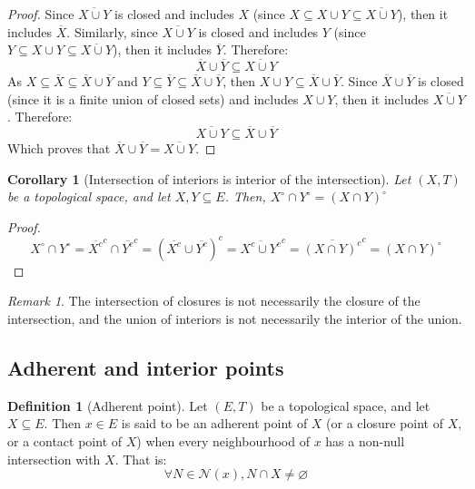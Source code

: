 \documentclass{article}
\newtheorem{corollary}[theorem]{Corollary}
\theoremstyle{definition}
\newtheorem{definition}{Definition}[section]
\theoremstyle{remark}
\newtheorem*{remark}{Remark}
\theoremstyle{example}
\theoremstyle{notation}
\newcommand{\inter}[1]{{{#1}^\circ}}
\begin{document}
\begin{proof}
		Since $\overline{X \cup Y}$ is closed and includes $X$ (since $X \subseteq X \cup Y \subseteq \overline{X \cup Y}$), then it includes $\overline{X}$. Similarly, since $\overline{X \cup Y}$ is closed and includes $Y$ (since $Y \subseteq X \cup Y \subseteq \overline{X \cup Y}$), then it includes $\overline{Y}$. Therefore:
				$$\overline{X} \cup \overline{Y} \subseteq \overline{X \cup Y}$$
		As $X \subseteq \overline{X} \subseteq \overline{X} \cup \overline{Y}$ and $Y \subseteq \overline{Y} \subseteq \overline{X} \cup \overline{Y}$, then $X \cup Y \subseteq \overline{X} \cup \overline{Y}$. Since $\overline{X} \cup \overline{Y}$ is closed (since it is a finite union of closed sets) and includes $X \cup Y$, then it includes $\overline{X \cup Y}$. Therefore:
				$$\overline{X \cup Y} \subseteq \overline{X} \cup \overline{Y}$$
		Which proves that $\overline{X} \cup \overline{Y} = \overline{X \cup Y}$.
\end{proof}

\begin{corollary}[Intersection of interiors is interior of the intersection]
		Let $(X, T)$ be a topological space, and let $X, Y \subseteq E$. Then, $\inter{X} \cap \inter{Y} = \inter{(X \cap Y)}$
\end{corollary}

\begin{proof}
		$$\inter{X} \cap \inter{Y} = \overline{X^c}^c \cap \overline{Y^c}^c = (\overline{X^c} \cup \overline{Y^c})^c = \overline{X^c \cup Y^c}^c = \overline{(X \cap Y)^c}^c = \inter{(X \cap Y)}$$
\end{proof}

\begin{remark}
		The intersection of closures is not necessarily the closure of the intersection, and the union of interiors is not necessarily the interior of the union.
\end{remark}

\subsection{Adherent and interior points}

\begin{definition}[Adherent point] %
		Let $(E, T)$ be a topological space, and let $X \subseteq E$. Then $x \in E$ is said to be an adherent point of $X$ (or a closure point of $X$, or a contact point of $X$) when every neighbourhood of $x$ has a non-null intersection with $X$. That is:
				$$\forall N \in \mathcal{N}(x), N \cap X \neq \varnothing$$
\end{definition}
\end{document}
